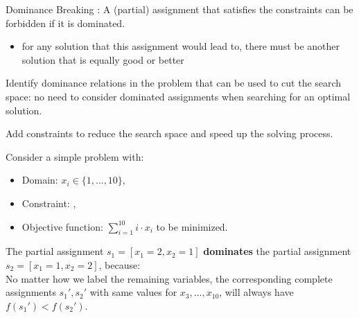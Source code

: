 \documentclass{cons-beamer}
\begin{document}
\begin{frame}{Dominance Breaking}
  : A (partial) assignment that satisfies the constraints can be forbidden if it is dominated.
  \begin{itemize}
    \item for any solution that this assignment would lead to, there must be another solution that is equally good or better
  \end{itemize}
  \vfill

  Identify dominance relations in the problem that can be used to cut the search space: no need to consider dominated assignments when searching for an optimal solution.
  \vfill

  Add  constraints to reduce the search space and speed up the solving process.
\end{frame}

\begin{frame}
  \begin{example}[Dominance]
    Consider a simple problem with:
    \begin{itemize}
      \item Domain: \( x_i \in \{1, \ldots, 10\} \),
      \item Constraint: ,
      \item Objective function: \( \sum_{i=1}^{10} i \cdot x_i \) to be minimized.
    \end{itemize}
    \vspace{5pt}

    The partial assignment \( s_1 = [x_1 = 2, x_2 = 1] \) \textbf{dominates} the partial assignment \( s_2 = [x_1 = 1, x_2 = 2] \), because:     \\[+5pt]
    No matter how we label the remaining variables,
    the corresponding complete assignments \( s_1', s_2' \) with same values for \( x_3, \ldots, x_{10} \),
    will always have $f(s_1') < f(s_2')$.
  \end{example}
\end{frame}
\end{document}
